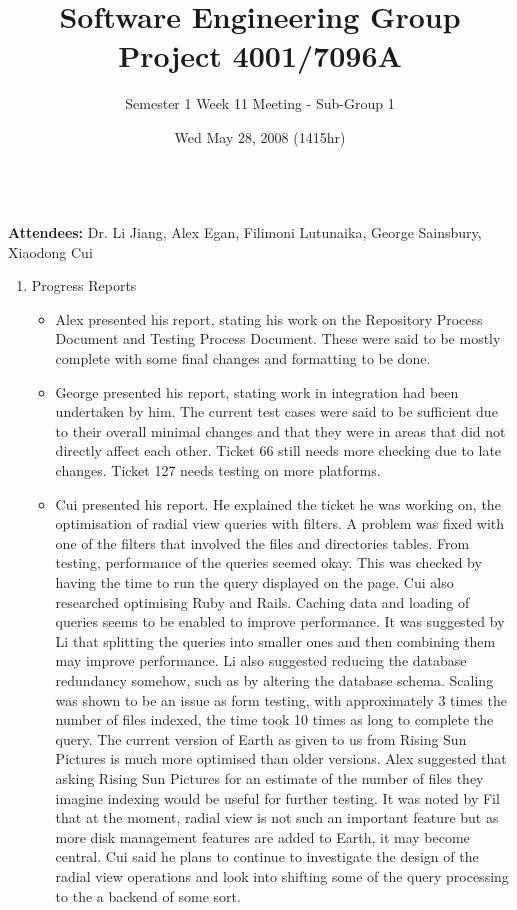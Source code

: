 \documentclass[10pt, a4]{article}
\begin{document}
\title{Software Engineering Group Project 4001/7096A}
\author{Semester 1 Week 11 Meeting - Sub-Group 1}
\date{Wed May 28, 2008 (1415hr)}

\maketitle
 
\\
 
\noindent \textbf{Attendees:} Dr. Li Jiang, Alex Egan, Filimoni Lutunaika, George Sainsbury, Xiaodong Cui\\

\begin{enumerate}
	\item Progress Reports
	\begin{itemize}
		\item Alex presented his report, stating his work on the Repository Process Document and Testing Process Document. These were said to be mostly complete with some final changes and formatting to be done.
		\item George presented his report, stating work in integration had been undertaken by him. The current test cases were said to be sufficient due to their overall minimal changes and that they were in areas that did not directly affect each other. Ticket 66 still needs more checking due to late changes. Ticket 127 needs testing on more platforms.
		\item Cui presented his report. He explained the ticket he was working on, the optimisation of radial view queries with filters. A problem was fixed with one of the filters that involved the files and directories tables. From testing, performance of the queries seemed okay. This was checked by having the time to run the query displayed on the page. Cui also researched optimising Ruby and Rails. Caching data and loading of queries seems to be enabled to improve performance. It was suggested by Li that splitting the queries into smaller ones and then combining them may improve performance. Li also suggested reducing the database redundancy somehow, such as by altering the database schema. Scaling was shown to be an issue as form testing, with approximately 3 times the number of files indexed, the time took 10 times as long to complete the query. The current version of Earth as given to us from Rising Sun Pictures is much more optimised than older versions. Alex suggested that asking Rising Sun Pictures for an estimate of the number of files they imagine indexing would be useful for further testing. It was noted by Fil that at the moment, radial view is not such an important feature but as more disk management features are added to Earth, it may become central. Cui said he plans to continue to investigate the design of the radial view operations and look into shifting some of the query processing to the a backend of some sort.

\end{itemize}
\end{enumerate}
\end{document}
